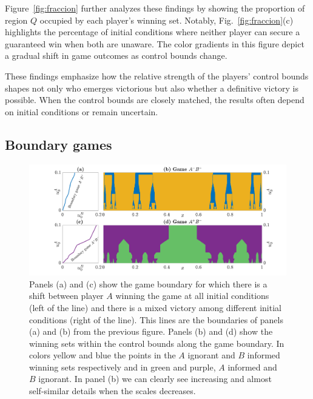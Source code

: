 Figure~\ref{fig:fraccion} further analyzes these findings by showing the proportion of region $Q$ occupied by each player's winning set. Notably, Fig.~\ref{fig:fraccion}(c) highlights the percentage of initial conditions where neither player can secure a guaranteed win when both are unaware. The color gradients in this figure depict a gradual shift in game outcomes as control bounds change.

These findings emphasize how the relative strength of the players' control bounds shapes not only who emerges victorious but also whether a definitive victory is possible. When the control bounds are closely matched, the results often depend on initial conditions or remain uncertain.


\subsection{Boundary games}

\begin{figure}
    \centering
    \includegraphics[trim={3.3cm 0cm 0cm 0cm}, clip,width=1.06\textwidth ]{Images/P5/bifurcation.png}
    \caption{Panels (a) and (c) show the game boundary for which there is a shift between player $A$ winning the game at all initial conditions (left of the line) and there is a mixed victory among different initial conditions (right of the line). This lines are the boundaries of panels (a) and (b) from the previous figure. Panels (b) and (d) show the winning sets within the control bounds along the game boundary. In colors yellow and blue the points in the $A$ ignorant and $B$ informed winning sets respectively and in green and purple, $A$ informed and $B$ ignorant. In panel (b) we can clearly see increasing and almost self-similar details when the scales decreases.}
    \label{fig:bifurcation}
\end{figure}






